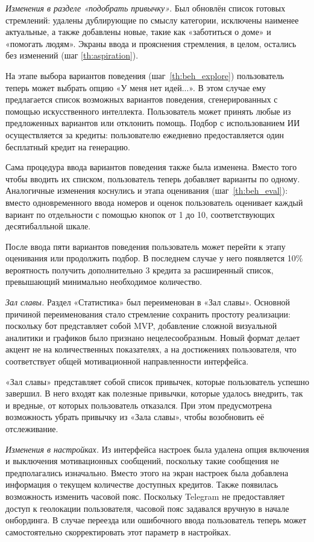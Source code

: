 \documentclass[pdflatex,sn-mathphys-num]{sn-jnl}%
\theoremstyle{thmstyleone}%
\theoremstyle{thmstyletwo}%
\theoremstyle{thmstylethree}%
\begin{document}
\textit{Изменения в разделе «подобрать привычку»}. Был обновлён список готовых стремлений: удалены дублирующие по смыслу категории, исключены наименее актуальные, а также добавлены новые, такие как «заботиться о доме» и «помогать людям». Экраны ввода и прояснения стремления, в целом, остались без изменений (шаг \ref{th:aspiration}).

На этапе выбора вариантов поведения (шаг~\ref{th:beh_explore}) пользователь теперь может выбрать опцию «У меня нет идей...». В этом случае ему предлагается список возможных вариантов поведения, сгенерированных с помощью искусственного интеллекта. Пользователь может принять любые из предложенных вариантов или отклонить помощь. Подбор с использованием ИИ осуществляется за кредиты: пользователю ежедневно предоставляется один бесплатный кредит на генерацию.

Сама процедура ввода вариантов поведения также была изменена. Вместо того чтобы вводить их списком, пользователь теперь добавляет варианты по одному. Аналогичные изменения коснулись и этапа оценивания (шаг~\ref{th:beh_eval}): вместо одновременного ввода номеров и оценок пользователь оценивает каждый вариант по отдельности с помощью кнопок от 1 до 10, соответствующих десятибалльной шкале.

После ввода пяти вариантов поведения пользователь может перейти к этапу оценивания или продолжить подбор. В последнем случае у него появляется 10\% вероятность получить дополнительно 3 кредита за расширенный список, превышающий минимально необходимое количество.

\textit{Зал славы.} Раздел «Статистика» был переименован в «Зал славы». Основной причиной переименования стало стремление сохранить простоту реализации: поскольку бот представляет собой MVP, добавление сложной визуальной аналитики и графиков было признано нецелесообразным. Новый формат делает акцент не на количественных показателях, а на достижениях пользователя, что соответствует общей мотивационной направленности интерфейса.

«Зал славы» представляет собой список привычек, которые пользователь успешно завершил. В него входят как полезные привычки, которые удалось внедрить, так и вредные, от которых пользователь отказался. При этом предусмотрена возможность убрать привычку из «Зала славы», чтобы возобновить её отслеживание.

\textit{Изменения в настройках.} Из интерфейса настроек была удалена опция включения и выключения мотивационных сообщений, поскольку такие сообщения не предполагались изначально. Вместо этого на экран настроек была добавлена информация о текущем количестве доступных кредитов. Также появилась возможность изменить часовой пояс. Поскольку Telegram не предоставляет доступ к геолокации пользователя, часовой пояс задавался вручную в начале онбординга. В случае переезда или ошибочного ввода пользователь теперь может самостоятельно скорректировать этот параметр в настройках.
\end{document}
